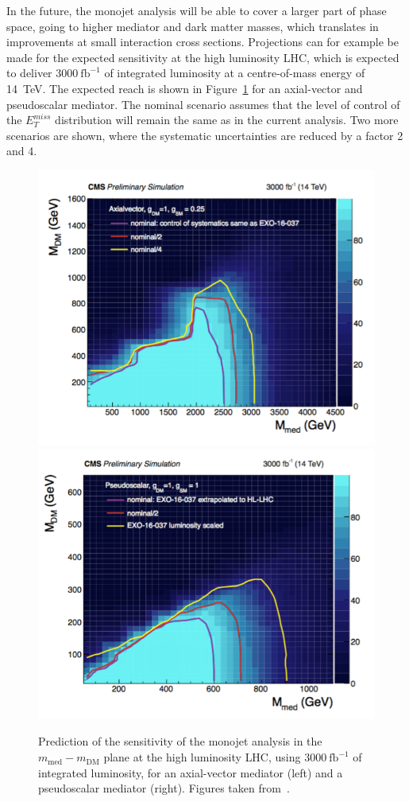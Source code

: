 
In the future, the monojet analysis will be able to cover a larger part of phase space, going to higher mediator and dark matter masses, which translates in improvements at small interaction cross sections. Projections can for example be made for the expected sensitivity at the high luminosity \ac{LHC}, which is expected to deliver $3000\ \mathrm{fb}^{-1}$ of integrated luminosity at a centre-of-mass energy of \SI{14}{TeV}. The expected reach is shown in Figure~\ref{fig:monojet_HLLHC} for an axial-vector and pseudoscalar mediator. 
The nominal scenario assumes that the level of control of the $E_T^{miss}$ distribution will remain the same as in the current analysis. Two more scenarios are shown, where the systematic uncertainties are reduced by a factor 2 and 4. 

\begin{figure}[ht]
  \centering
 \includegraphics[width=.49\textwidth]{monojet_axial}
 \includegraphics[width=.49\textwidth]{monojet_pseudoscalar}
 \caption{Prediction of the sensitivity of the monojet analysis in the $m_{\mathrm{med}}-m_{\mathrm{DM}}$ plane at the high luminosity \ac{LHC}, using $3000\ \mathrm{fb}^{-1}$ of integrated luminosity, for an axial-vector mediator (left) and a pseudoscalar mediator (right). Figures taken from~\cite{CMS-DP-2016-064}.}
 \label{fig:monojet_HLLHC}
\end{figure}


